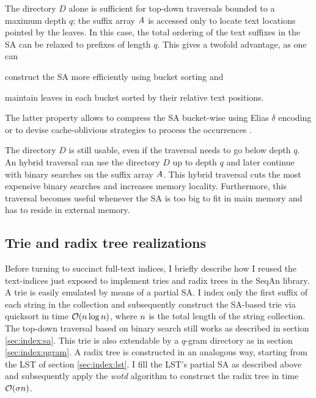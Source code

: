 The directory $D$ alone is sufficient for top-down traversals bounded to a maximum depth $q$;
the suffix array $A$ is accessed only to locate text locations pointed by the leaves.
In this case, the total ordering of the text suffixes in the SA can be relaxed to prefixes of length $q$.
This gives a twofold advantage, as one can
\begin{inparaenum}[(i)]
\item construct the SA more efficiently using bucket sorting and
\item maintain leaves in each bucket sorted by their relative text positions.
\end{inparaenum}
The latter property allows to compress the SA bucket-wise \eg using Elias $\delta$ encoding \citep{Elias1975} or to devise cache-oblivious strategies to process the occurrences \citep{Hach2010}.

The directory $D$ is still usable, even if the traversal needs to go below depth $q$.
An hybrid traversal can use the directory $D$ up to depth $q$ and later continue with binary searches on the suffix array $A$.
This hybrid traversal cuts the most expensive binary searches and increases memory locality.
Furthermore, this traversal becomes useful whenever the SA is too big to fit in main memory and has to reside in external memory.

\subsection{Trie and radix tree realizations}
\label{sec:index:trie}

Before turning to succinct full-text indices, I briefly describe how I reused the text-indices just exposed to implement tries and radix trees in the SeqAn library.
A trie is easily emulated by means of a partial SA.
I index only the first suffix of each string in the collection and subsequently construct the SA-based trie via quicksort in time $\mathcal{O}(n \log{n})$, where $n$ is the total length of the string collection.
The top-down traversal based on binary search still works as described in section \ref{sec:index:sa}.
This trie is also extendable by a $q$-gram directory as in section \ref{sec:index:qgram}.
A radix tree is constructed in an analogous way, starting from the LST of section \ref{sec:index:lst}.
I fill the LST's partial SA as described above and subsequently apply the \emph{wotd} algorithm \citep{Giegerich1999} to construct the radix tree in time $\mathcal{O}(\sigma n)$.


